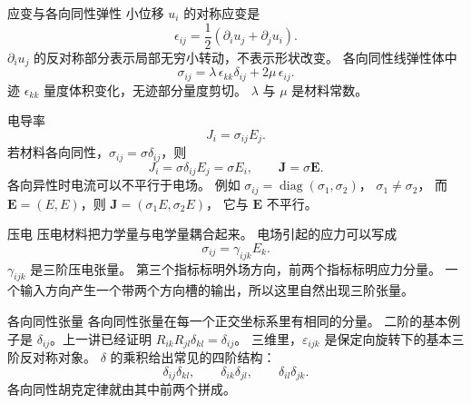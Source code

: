 \documentclass[fontset=windows, chinese, 10pt, xcolor=dvipsnames]{beamer}
\begin{document}
\begin{frame}{应变与各向同性弹性}
  小位移 $u_i$ 的对称应变是
  \begin{equation*}
    \epsilon_{ij}
    =\frac12(\partial_i u_j+\partial_j u_i).
  \end{equation*}
  $\partial_i u_j$ 的反对称部分表示局部无穷小转动，不表示形状改变。
  各向同性线弹性体中
  \begin{equation*}
    \sigma_{ij}
    =\lambda\,\epsilon_{kk}\delta_{ij}+2\mu\,\epsilon_{ij}.
  \end{equation*}
  迹 $\epsilon_{kk}$ 量度体积变化，无迹部分量度剪切。
  $\lambda$ 与 $\mu$ 是材料常数。
\end{frame}

\begin{frame}{电导率}
  \begin{equation*}
    J_i=\sigma_{ij}E_j.
  \end{equation*}
  若材料各向同性，$\sigma_{ij}=\sigma\delta_{ij}$，则
  \begin{equation*}
    J_i=\sigma\delta_{ij}E_j=\sigma E_i,
    \qquad
    \mathbf{J}=\sigma\mathbf{E}.
  \end{equation*}
  各向异性时电流可以不平行于电场。
  例如
  $\sigma_{ij}=\operatorname{diag}(\sigma_1,\sigma_2)$，
  $\sigma_1\neq\sigma_2$，
  而 $\mathbf{E}=(E,E)$，则
  $\mathbf{J}=(\sigma_1 E,\sigma_2 E)$，
  它与 $\mathbf{E}$ 不平行。
\end{frame}

\begin{frame}{压电}
  压电材料把力学量与电学量耦合起来。
  电场引起的应力可以写成
  \begin{equation*}
    \sigma_{ij}=\gamma_{ijk}E_k.
  \end{equation*}
  $\gamma_{ijk}$ 是三阶压电张量。
  第三个指标标明外场方向，前两个指标标明应力分量。
  一个输入方向产生一个带两个方向槽的输出，所以这里自然出现三阶张量。
\end{frame}

\begin{frame}{各向同性张量}
  各向同性张量在每一个正交坐标系里有相同的分量。
  二阶的基本例子是 $\delta_{ij}$。上一讲已经证明
  $R_{ik}R_{jl}\delta_{kl}=\delta_{ij}$。
  \vspace{0.3em}
  三维里，$\varepsilon_{ijk}$ 是保定向旋转下的基本三阶反对称对象。
  $\delta$ 的乘积给出常见的四阶结构：
  \begin{equation*}
    \delta_{ij}\delta_{kl},
    \qquad
    \delta_{ik}\delta_{jl},
    \qquad
    \delta_{il}\delta_{jk}.
  \end{equation*}
  各向同性胡克定律就由其中前两个拼成。
\end{frame}
\end{document}
